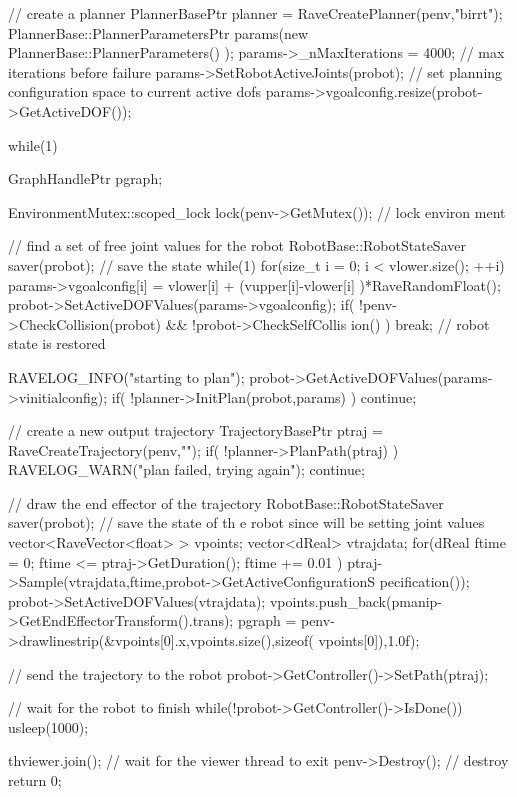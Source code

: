 \begin{DoxyCodeInclude}
{    // create a planner
    PlannerBasePtr planner = RaveCreatePlanner(penv,"birrt");
    PlannerBase::PlannerParametersPtr params(new PlannerBase::PlannerParameters()
      );
    params->_nMaxIterations = 4000; // max iterations before failure
    params->SetRobotActiveJoints(probot); // set planning configuration space to 
      current active dofs
    params->vgoalconfig.resize(probot->GetActiveDOF());

    while(1) {
        GraphHandlePtr pgraph;
        {
            EnvironmentMutex::scoped_lock lock(penv->GetMutex()); // lock environ
      ment

            // find a set of free joint values for the robot
            {
                RobotBase::RobotStateSaver saver(probot); // save the state
                while(1) {
                    for(size_t i = 0; i < vlower.size(); ++i) {
                        params->vgoalconfig[i] = vlower[i] + (vupper[i]-vlower[i]
      )*RaveRandomFloat();
                    }
                    probot->SetActiveDOFValues(params->vgoalconfig);
                    if( !penv->CheckCollision(probot) && !probot->CheckSelfCollis
      ion() ) {
                        break;
                    }
                }
                // robot state is restored
            }

            RAVELOG_INFO("starting to plan\n");
            probot->GetActiveDOFValues(params->vinitialconfig);
            if( !planner->InitPlan(probot,params) ) {
                continue;
            }

            // create a new output trajectory
            TrajectoryBasePtr ptraj = RaveCreateTrajectory(penv,"");
            if( !planner->PlanPath(ptraj) ) {
                RAVELOG_WARN("plan failed, trying again\n");
                continue;
            }

            // draw the end effector of the trajectory
            {
                RobotBase::RobotStateSaver saver(probot); // save the state of th
      e robot since will be setting joint values
                vector<RaveVector<float> > vpoints;
                vector<dReal> vtrajdata;
                for(dReal ftime = 0; ftime <= ptraj->GetDuration(); ftime += 0.01
      ) {
                    ptraj->Sample(vtrajdata,ftime,probot->GetActiveConfigurationS
      pecification());
                    probot->SetActiveDOFValues(vtrajdata);
                    vpoints.push_back(pmanip->GetEndEffectorTransform().trans);
                }
                pgraph = penv->drawlinestrip(&vpoints[0].x,vpoints.size(),sizeof(
      vpoints[0]),1.0f);
            }

            // send the trajectory to the robot
            probot->GetController()->SetPath(ptraj);
        }


        // wait for the robot to finish
        while(!probot->GetController()->IsDone()) {
            usleep(1000);
        }
    }

    thviewer.join(); // wait for the viewer thread to exit
    penv->Destroy(); // destroy
    return 0;
}
\end{DoxyCodeInclude}
 